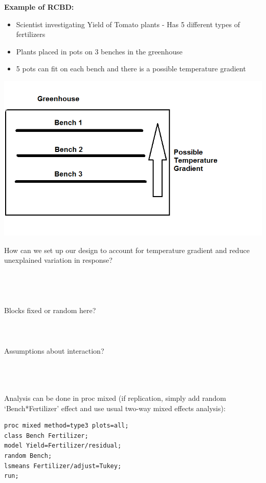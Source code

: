 \newpage

\textbf{Example of RCBD:}
    \begin{itemize}
        \item{Scientist investigating Yield of Tomato plants - Has 5 different types of fertilizers}
        \item{Plants placed in pots on 3 benches in the greenhouse}
     		\item{5 pots can fit on each bench and there is a possible temperature gradient}
    \end{itemize}

\begin{center}
    \includegraphics[scale=0.45]{layout1.png}
\end{center}

How can we set up our design to account for temperature gradient and reduce unexplained variation in response?\\~\\~\\~\\~\\
Blocks fixed or random here?\\~\\~\\~\\
Assumptions about interaction?\\~\\~\\~\\

\newpage

Analysis can be done in proc mixed (if replication, simply add random `Bench*Fertilizer' effect and use usual two-way mixed effects analysis):
\begin{small}
\begin{verbatim}
proc mixed method=type3 plots=all;
class Bench Fertilizer;
model Yield=Fertilizer/residual;
random Bench;
lsmeans Fertilizer/adjust=Tukey;
run;
\end{verbatim}
\end{small}

